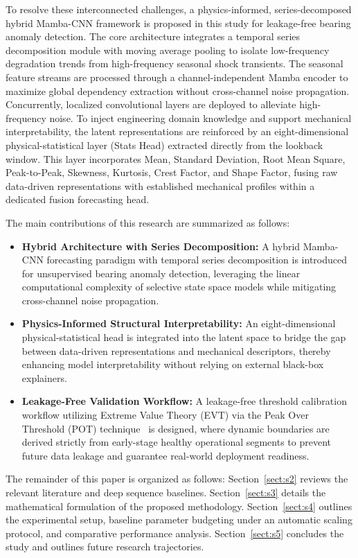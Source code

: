 \documentclass[cmes,article,submit,moreauthors,pdftex]{Definitions/tsp}
\begin{document}
To resolve these interconnected challenges, a physics-informed, series-decomposed hybrid Mamba-CNN framework is proposed in this study for leakage-free bearing anomaly detection. The core architecture integrates a temporal series decomposition module with moving average pooling to isolate low-frequency degradation trends from high-frequency seasonal shock transients. The seasonal feature streams are processed through a channel-independent Mamba encoder to maximize global dependency extraction without cross-channel noise propagation. Concurrently, localized convolutional layers are deployed to alleviate high-frequency noise. To inject engineering domain knowledge and support mechanical interpretability, the latent representations are reinforced by an eight-dimensional physical-statistical layer (Stats Head) extracted directly from the lookback window. This layer incorporates Mean, Standard Deviation, Root Mean Square, Peak-to-Peak, Skewness, Kurtosis, Crest Factor, and Shape Factor, fusing raw data-driven representations with established mechanical profiles within a dedicated fusion forecasting head.

The main contributions of this research are summarized as follows:
\begin{itemize}
\item \textbf{Hybrid Architecture with Series Decomposition:} A hybrid Mamba-CNN forecasting paradigm with temporal series decomposition is introduced for unsupervised bearing anomaly detection, leveraging the linear computational complexity of selective state space models while mitigating cross-channel noise propagation.
\item \textbf{Physics-Informed Structural Interpretability:} An eight-dimensional physical-statistical head is integrated into the latent space to bridge the gap between data-driven representations and mechanical descriptors, thereby enhancing model interpretability without relying on external black-box explainers.
\item \textbf{Leakage-Free Validation Workflow:} A leakage-free threshold calibration workflow utilizing Extreme Value Theory (EVT) via the Peak Over Threshold (POT) technique~\cite{ref-10} is designed, where dynamic boundaries are derived strictly from early-stage healthy operational segments to prevent future data leakage and guarantee real-world deployment readiness.
\end{itemize}

The remainder of this paper is organized as follows: Section~\ref{sect:s2} reviews the relevant literature and deep sequence baselines. Section~\ref{sect:s3} details the mathematical formulation of the proposed methodology. Section~\ref{sect:s4} outlines the experimental setup, baseline parameter budgeting under an automatic scaling protocol, and comparative performance analysis. Section~\ref{sect:s5} concludes the study and outlines future research trajectories.
\end{document}

